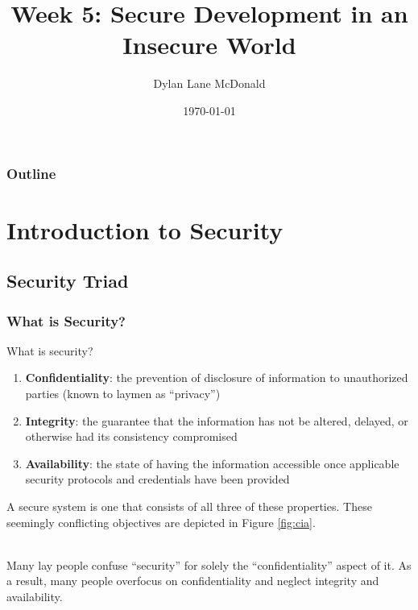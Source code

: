 \documentclass[aspectratio=169]{beamer}
\title{Week 5: Secure Development in an Insecure World}
\author{Dylan Lane McDonald}
\institute{CNM STEMulus Center\\Web Development with PHP}
\date{\today}
\begin{document}
\lstset{language=Java}
\begin{frame}
\titlepage
\end{frame}

\begin{frame}
\frametitle{Outline}
\tableofcontents
\end{frame}

\section{Introduction to Security}
\subsection{Security Triad}
\begin{frame}
\frametitle{What is Security?}
What is security?
\pause
\begin{enumerate}
	\item \textbf{Confidentiality}: the prevention of disclosure of information to unauthorized parties (known to laymen as ``privacy'')
	\item \textbf{Integrity}: the guarantee that the information has not be altered, delayed, or otherwise had its consistency compromised
	\item \textbf{Availability}: the state of having the information accessible once applicable security protocols and credentials have been provided
\end{enumerate}
A secure system is one that consists of all three of these properties. These seemingly conflicting objectives are depicted in Figure \ref{fig:cia}.

\mbox{}\\
Many lay people confuse ``security'' for solely the ``confidentiality'' aspect of it. As a result, many people overfocus on confidentiality and neglect integrity and availability.
\end{frame}
\end{document}
